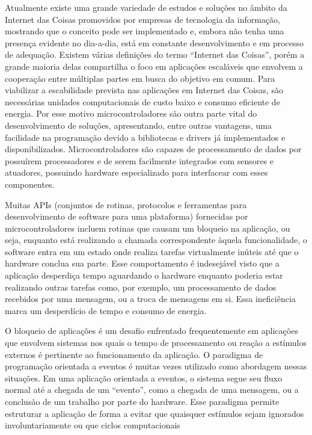 \documentclass{article}
\begin{document}
\tab Atualmente existe uma grande variedade de estudos e soluções no âmbito da Internet das Coisas
promovidos por empresas de tecnologia da informação, mostrando que o conceito pode ser
implementado e, embora não tenha uma presença evidente no dia-a-dia, está em constante
desenvolvimento e em processo de adequação. Existem várias definições do termo “Internet das
Coisas”, porém a grande maioria delas compartilha o foco em aplicações escaláveis que envolvem a cooperação entre múltiplas partes em busca do objetivo em comum.  \cite{singh2014}
Para viabilizar a escabilidade prevista nas aplicações em Internet das Coisas, são necessárias unidades
computacionais de custo baixo e consumo eficiente de energia. Por esse motivo microcontroladores
são outra parte vital do desenvolvimento de soluções, apresentando, entre outras vantagens, uma
facilidade na programação devido a bibliotecas e drivers já implementados e disponibilizados.
Microcontroladores são capazes de processamento de dados por possuírem processadores e de
serem facilmente integrados com sensores e atuadores, possuindo hardware especializado para
interfacear com esses componentes.
\par Muitas APIs (conjuntos de rotinas, protocolos e ferramentas para desenvolvimento de software para
uma plataforma) fornecidas por microcontroladores incluem rotinas que causam um bloqueio na
aplicação, ou seja, enquanto está realizando a chamada correspondente àquela funcionalidade, o
software entra em um estado onde realiza tarefas virtualmente inúteis até que o hardware conclua sua
parte. Esse comportamento é indesejável visto que a aplicação desperdiça tempo aguardando o
hardware enquanto poderia estar realizando outras tarefas como, por exemplo, um processamento de
dados recebidos por uma mensagem, ou a troca de mensagens em si. Essa ineficiência marca um
desperdício de tempo e consumo de energia.
\par O bloqueio de aplicações é um desafio enfrentado frequentemente em aplicações que envolvem
sistemas nos quais o tempo de processamento ou reação a estímulos externos é pertinente ao
funcionamento da aplicação. O paradigma de programação orientada a eventos é muitas vezes
utilizado como abordagem nessas situações. Em uma aplicação orientada a eventos, o sistema segue
seu fluxo normal até a chegada de um “evento”, como a chegada de uma mensagem, ou a conclusão
de um trabalho por parte do hardware. Esse paradigma permite estruturar a aplicação de forma a evitar que
quaisquer estímulos sejam ignorados involuntariamente ou que ciclos computacionais
\end{document}
